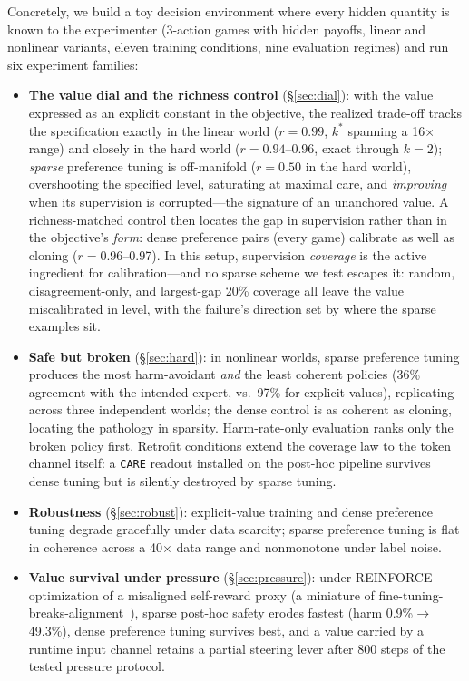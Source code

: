 \documentclass[manuscript, screen, review]{jair}
\newcommand{\care}{\texttt{CARE}}
\begin{document}
Concretely, we build a toy decision environment where every hidden quantity is known to the experimenter (3-action games with hidden payoffs, linear and nonlinear variants, eleven training conditions, nine evaluation regimes) and run six experiment families:

\begin{itemize}
\item \textbf{The value dial and the richness control} (\S\ref{sec:dial}): with the value expressed as an explicit constant in the objective, the realized trade-off tracks the specification exactly in the linear world ($r{=}0.99$, $k^*$ spanning a 16$\times$ range) and closely in the hard world ($r{=}0.94$--0.96, exact through $k{=}2$); \emph{sparse} preference tuning is off-manifold ($r{=}0.50$ in the hard world), overshooting the specified level, saturating at maximal care, and \emph{improving} when its supervision is corrupted---the signature of an unanchored value. A richness-matched control then locates the gap in supervision rather than in the objective's \emph{form}: dense preference pairs (every game) calibrate as well as cloning ($r{=}0.96$--0.97). In this setup, supervision \emph{coverage} is the active ingredient for calibration---and no sparse scheme we test escapes it: random, disagreement-only, and largest-gap 20\% coverage all leave the value miscalibrated in level, with the failure's direction set by where the sparse examples sit.
\item \textbf{Safe but broken} (\S\ref{sec:hard}): in nonlinear worlds, sparse preference tuning produces the most harm-avoidant \emph{and} the least coherent policies (36\% agreement with the intended expert, vs.\ 97\% for explicit values), replicating across three independent worlds; the dense control is as coherent as cloning, locating the pathology in sparsity. Harm-rate-only evaluation ranks only the broken policy first. Retrofit conditions extend the coverage law to the token channel itself: a \care{} readout installed on the post-hoc pipeline survives dense tuning but is silently destroyed by sparse tuning.
\item \textbf{Robustness} (\S\ref{sec:robust}): explicit-value training and dense preference tuning degrade gracefully under data scarcity; sparse preference tuning is flat in coherence across a 40$\times$ data range and nonmonotone under label noise.
\item \textbf{Value survival under pressure} (\S\ref{sec:pressure}): under REINFORCE optimization of a misaligned self-reward proxy (a miniature of fine-tuning-breaks-alignment~\citep{qi2023finetuning}), sparse post-hoc safety erodes fastest (harm 0.9\%$\to$49.3\%), dense preference tuning survives best, and a value carried by a runtime input channel retains a partial steering lever after 800 steps of the tested pressure protocol.

\end{itemize}
\end{document}

